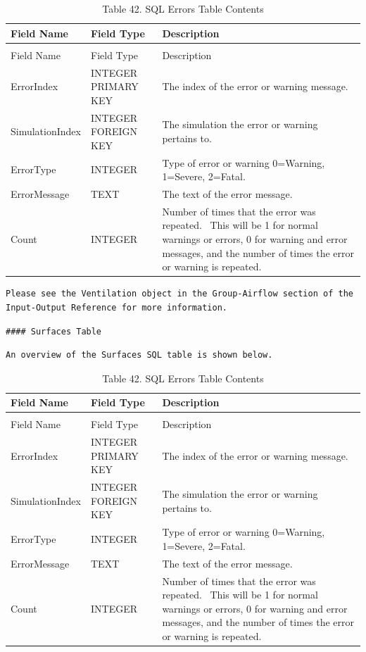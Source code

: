 \begin{longtable}[c]{p{1.5in}p{1.5in}p{2.99in}}
\caption{Table 42. SQL Errors Table Contents \label{table:table-42.-sql-errors-table-contents}} \tabularnewline
\toprule 
Field Name & Field Type & Description \tabularnewline
\midrule
\endfirsthead

\caption[]{Table 42. SQL Errors Table Contents} \tabularnewline
\toprule 
Field Name & Field Type & Description \tabularnewline
\midrule
\endhead

ErrorIndex & INTEGER PRIMARY KEY & The index of the error or warning message. \tabularnewline
SimulationIndex & INTEGER FOREIGN KEY & The simulation the error or warning pertains to. \tabularnewline
ErrorType & INTEGER & Type of error or warning 0=Warning, 1=Severe, 2=Fatal. \tabularnewline
ErrorMessage & TEXT & The text of the error message. \tabularnewline
Count & INTEGER & Number of times that the error was repeated.~ This will be 1 for normal warnings or errors, 0 for warning and error messages, and the number of times the error or warning is repeated. \tabularnewline
\bottomrule
\end{longtable}

\begin{lstlisting}
Please see the Ventilation object in the Group-Airflow section of the Input-Output Reference for more information.
\end{lstlisting}

\begin{lstlisting}
#### Surfaces Table
\end{lstlisting}

\begin{lstlisting}
An overview of the Surfaces SQL table is shown below.
\end{lstlisting}

\begin{longtable}[c]{p{1.5in}p{1.5in}p{2.99in}}
\caption{Table 42. SQL Errors Table Contents \label{table:table-42.-sql-errors-table-contents}} \tabularnewline
\toprule 
Field Name & Field Type & Description \tabularnewline
\midrule
\endfirsthead

\caption[]{Table 42. SQL Errors Table Contents} \tabularnewline
\toprule 
Field Name & Field Type & Description \tabularnewline
\midrule
\endhead

ErrorIndex & INTEGER PRIMARY KEY & The index of the error or warning message. \tabularnewline
SimulationIndex & INTEGER FOREIGN KEY & The simulation the error or warning pertains to. \tabularnewline
ErrorType & INTEGER & Type of error or warning 0=Warning, 1=Severe, 2=Fatal. \tabularnewline
ErrorMessage & TEXT & The text of the error message. \tabularnewline
Count & INTEGER & Number of times that the error was repeated.~ This will be 1 for normal warnings or errors, 0 for warning and error messages, and the number of times the error or warning is repeated. \tabularnewline
\bottomrule
\end{longtable}

